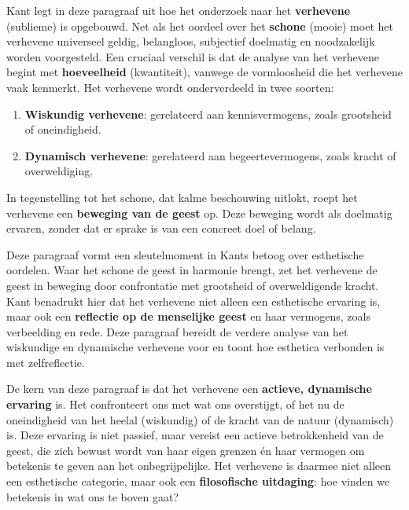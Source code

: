 \begin{mdframed}[leftmargin=0pt,rightmargin=0pt,backgroundcolor=blue!6,linecolor=white,innertopmargin=6pt,innerbottommargin=6pt]

Kant legt in deze paragraaf uit hoe het onderzoek naar het \textbf{verhevene} (sublieme) is opgebouwd. Net als het oordeel over het \textbf{schone} (mooie) moet het verhevene universeel geldig, belangloos, subjectief doelmatig en noodzakelijk worden voorgesteld. Een cruciaal verschil is dat de analyse van het verhevene begint met \textbf{hoeveelheid} (kwantiteit), vanwege de vormloosheid die het verhevene vaak kenmerkt. Het verhevene wordt onderverdeeld in twee soorten:
\begin{enumerate}
    \item \textbf{Wiskundig verhevene}: gerelateerd aan kennisvermogens, zoals grootsheid of oneindigheid.
    \item \textbf{Dynamisch verhevene}: gerelateerd aan begeertevermogens, zoals kracht of overweldiging.
\end{enumerate}

In tegenstelling tot het schone, dat kalme beschouwing uitlokt, roept het verhevene een \textbf{beweging van de geest} op. Deze beweging wordt als doelmatig ervaren, zonder dat er sprake is van een concreet doel of belang.

\bigskip
Deze paragraaf vormt een sleutelmoment in Kants betoog over esthetische oordelen. Waar het schone de geest in harmonie brengt, zet het verhevene de geest in beweging door confrontatie met grootsheid of overweldigende kracht. Kant benadrukt hier dat het verhevene niet alleen een esthetische ervaring is, maar ook een \textbf{reflectie op de menselijke geest} en haar vermogens, zoals verbeelding en rede. Deze paragraaf bereidt de verdere analyse van het wiskundige en dynamische verhevene voor en toont hoe esthetica verbonden is met zelfreflectie.

De kern van deze paragraaf is dat het verhevene een \textbf{actieve, dynamische ervaring} is. Het confronteert ons met wat ons overstijgt, of het nu de oneindigheid van het heelal (wiskundig) of de kracht van de natuur (dynamisch) is. Deze ervaring is niet passief, maar vereist een actieve betrokkenheid van de geest, die zich bewust wordt van haar eigen grenzen én haar vermogen om betekenis te geven aan het onbegrijpelijke. Het verhevene is daarmee niet alleen een esthetische categorie, maar ook een \textbf{filosofische uitdaging}: hoe vinden we betekenis in wat ons te boven gaat?


\end{mdframed}

